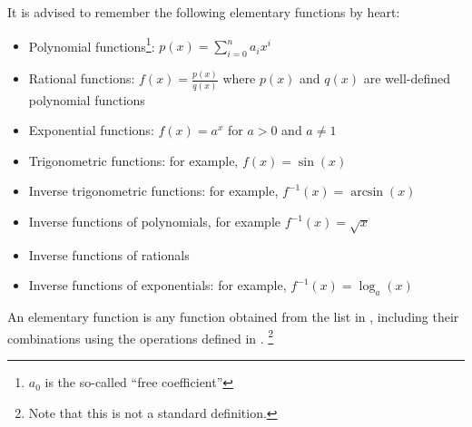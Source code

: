 \begin{rem}\label{rem-elementary-functions}
	It is advised to remember the following elementary functions by heart:
	\begin{itemize}
		\item Polynomial functions\footnote{$a_0$ is the so-called \enquote{free coefficient}}: $p(x)=\sum_{i=0}^na_ix^i$
		\item Rational functions: $f(x)=\tfrac{p(x)}{q(x)}$ where $p(x)$ and $q(x)$ are well-defined polynomial functions
		\item Exponential functions: $f(x)=a^x$ for $a>0$ and $a\neq 1$
		\item Trigonometric functions: for example, $f(x)=\sin(x)$
		\item Inverse trigonometric functions: for example, $f^{-1}(x)=\arcsin(x)$
		\item Inverse functions of polynomials, for example $f^{-1}(x)=\sqrt{x}$
		\item Inverse functions of rationals
		\item Inverse functions of exponentials: for example, $f^{-1}(x)=\log_a(x)$
	\end{itemize}
\end{rem}

\begin{definition}\label{def-elementary-functions}
	An elementary function is any function obtained from the list in ,
	including their combinations using the operations defined in .
	\footnote{Note that this is not a standard definition.}
\end{definition}
